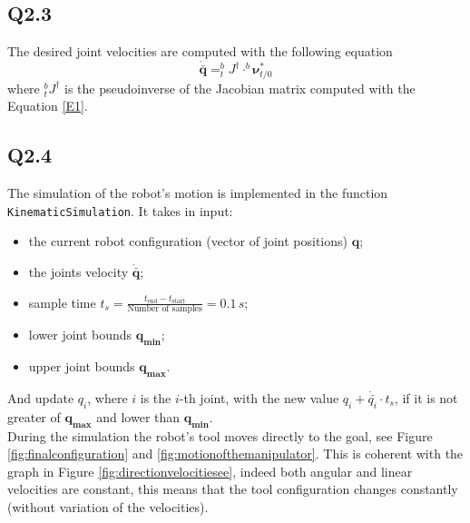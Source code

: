 \subsection{Q2.3}
The desired joint velocities are computed with the following equation
\begin{equation*}
	\dot{\bar{\mathbf{q}}} = ^b_t J ^\dagger \cdot ^b \boldsymbol\nu^*_{t/0}
\end{equation*}
where $^b_t J ^\dagger$ is the pseudoinverse of the Jacobian matrix computed with the Equation \ref{E1}.

\subsection{Q2.4}
The simulation of the robot's motion is implemented in the function \verb*|KinematicSimulation|. It takes in input: 
\begin{itemize}
	\item the current robot configuration (vector of joint positions) $\mathbf{q}$;
	\item the joints velocity $\dot{\bar{\mathbf{q}}}$;
	\item sample time $t_{s} = \frac{t_{\text{end}} - t_{\text{start}}}{\text{Number of samples}} = 0.1 \,s$;
	\item lower joint bounds $\mathbf{q_{\text{min}}}$;
	\item upper joint bounds $\mathbf{q_{\text{max}}}$.
\end{itemize}
And update $q_{i}$, where $i$ is the $i$-th joint, with the new value $q_{i} + \dot{\bar{q_{i}}} \cdot t_{s}$, if it is not greater of $\mathbf{q_{\text{max}}}$ and lower than $\mathbf{q_{\text{min}}}$. \\
During the simulation the robot's tool moves directly to the goal, see Figure \ref{fig:finalconfiguration} and \ref{fig:motionofthemanipulator}. This is coherent with the graph in Figure \ref{fig:directionvelocitiesee}, indeed both angular and linear velocities are constant, this means that the tool configuration changes constantly (without variation of the velocities).

